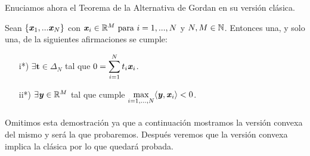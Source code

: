 	Enuciamos ahora el Teorema de la Alternativa de Gordan en su versión clásica.
	\begin{teoremaBox}\label{GordanClasic}
		Sean $ \{\textbf{\emph{x}}_1,...\textbf{\emph{x}}_N\}$ con $ \textbf{\emph{x}}_i \in \mathbb{R}^M \text{ para } i=1,...,N$ y $ N, M \in \mathbb{N} $. Entonces una, y solo una, de la siguientes afirmaciones se cumple:
		
		\begin{itemize}
			\item[i*)] $ \exists \mathbf{t} \in \Delta_N $ tal que  $  0 = \displaystyle \sum_{i=1}^{N}{t_i \textbf{\emph{x}}_i}$.
			\item[ii*)] $ \exists \textbf{\emph{y}} \in \mathbb{R}^M $ tal que cumple $ \displaystyle \max_{i=1,...,N} \langle \textbf{\emph{y}}, \textbf{\emph{x}}_i \rangle < 0 $.
		\end{itemize}
	\end{teoremaBox}

	\paragraph{} Omitimos esta demostración ya que a continuación mostramos la versión convexa del mismo y será la que probaremos. Después veremos que la versión convexa  implica la clásica por lo que quedará probada.
	
